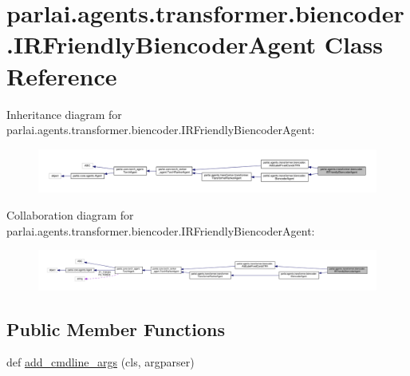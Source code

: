 \hypertarget{classparlai_1_1agents_1_1transformer_1_1biencoder_1_1IRFriendlyBiencoderAgent}{}\section{parlai.\+agents.\+transformer.\+biencoder.\+I\+R\+Friendly\+Biencoder\+Agent Class Reference}
\label{classparlai_1_1agents_1_1transformer_1_1biencoder_1_1IRFriendlyBiencoderAgent}


Inheritance diagram for parlai.\+agents.\+transformer.\+biencoder.\+I\+R\+Friendly\+Biencoder\+Agent\+:
\nopagebreak
\begin{figure}[H]
\begin{center}
\leavevmode
\includegraphics[width=350pt]{da/d8d/classparlai_1_1agents_1_1transformer_1_1biencoder_1_1IRFriendlyBiencoderAgent__inherit__graph}
\end{center}
\end{figure}


Collaboration diagram for parlai.\+agents.\+transformer.\+biencoder.\+I\+R\+Friendly\+Biencoder\+Agent\+:
\nopagebreak
\begin{figure}[H]
\begin{center}
\leavevmode
\includegraphics[width=350pt]{d2/dc5/classparlai_1_1agents_1_1transformer_1_1biencoder_1_1IRFriendlyBiencoderAgent__coll__graph}
\end{center}
\end{figure}
\subsection*{Public Member Functions}
\begin{DoxyCompactItemize}
\item 
def \hyperlink{classparlai_1_1agents_1_1transformer_1_1biencoder_1_1IRFriendlyBiencoderAgent_a8ad3444ddd1002990ce5472fa1ec72bf}{add\+\_\+cmdline\+\_\+args} (cls, argparser)
\end{DoxyCompactItemize}
